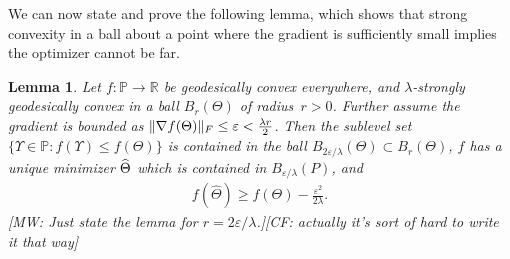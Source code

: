 \documentclass[aos]{imsart}
\newtheorem{lemma}[theorem]{Lemma}
\theoremstyle{definition}
\numberwithin{equation}{section}
\DeclarePairedDelimiter{\norm}{\lVert}{\rVert}
\newcommand{\R}{{\mathbb{R}}}
\renewcommand{\P}{{\mathbb{P}}}
\newcommand{\htheta}{\widehat{\Theta}}
\newcommand{\eps}{\varepsilon}
\newcommand{\CF}[1]{{\color{purple}[CF: #1]}}
\newcommand{\MW}[1]{{\color{red}[MW: #1]}}
\begin{document}
We can now state and prove the following lemma, which shows that strong convexity in a ball about a point where the gradient is sufficiently small implies the optimizer cannot be far.

\begin{lemma}\label{lem:convex-ball}
Let $f\colon \P \to \R$ be geodesically convex everywhere, and $\lambda$-strongly geodesically convex in a ball $B_r(\Theta)$ of radius~$r>0$.
Further assume the gradient is bounded as $\norm{\nabla f(\Theta)}_F \leq \eps < \frac{\lambda r} 2$.
Then the sublevel set $\{\Upsilon \in \P : f(\Upsilon) \leq f(\Theta)\}$ is contained in the ball $B_{2\eps/\lambda}(\Theta) \subset B_r(\Theta)$, $f$ has a unique minimizer $\cramped{\htheta}$ which is contained in $B_{\eps/\lambda}(P)$, and
\begin{align}\label{eq:minimum lower bound}
  f(\htheta) \geq f(\Theta) - \frac{\eps^2}{2 \lambda}.
\end{align}
\MW{Just state the lemma for $r=2\eps/\lambda$.}\CF{actually it's sort of hard to write it that way}
\end{lemma}
\end{document}
